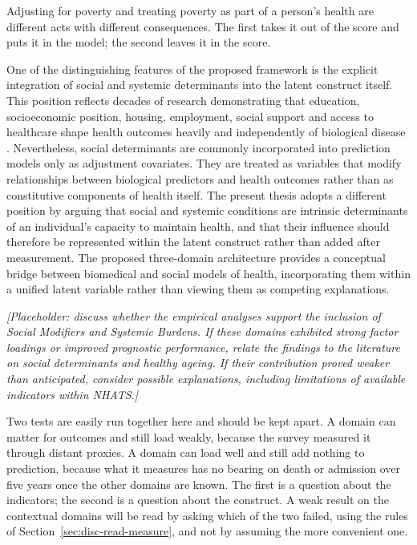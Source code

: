Adjusting for poverty and treating poverty as part of a person's health are
different acts with different consequences. The first takes it out of the score
and puts it in the model; the second leaves it in the score.

One of the distinguishing features of the proposed framework is the explicit integration of social and systemic determinants into the latent construct itself. This position reflects decades of research demonstrating that education, socioeconomic position, housing, employment, social support and access to healthcare shape health outcomes heavily and independently of biological disease \citep{marmot_2005}. Nevertheless, social determinants are commonly incorporated into prediction models only as adjustment covariates. They are treated as variables that modify relationships between biological predictors and health outcomes rather than as constitutive components of health itself. The present thesis adopts a different position by arguing that social and systemic conditions are intrinsic determinants of an individual's capacity to maintain health, and that their influence should therefore be represented within the latent construct rather than added after measurement. The proposed three-domain architecture provides a conceptual bridge between biomedical and social models of health, incorporating them within a unified latent variable rather than viewing them as competing explanations.

\medskip
\noindent\emph{[Placeholder: discuss whether the empirical analyses support the inclusion of Social Modifiers and Systemic Burdens. If these domains exhibited strong factor loadings or improved prognostic performance, relate the findings to the literature on social determinants and healthy ageing. If their contribution proved weaker than anticipated, consider possible explanations, including limitations of available indicators within NHATS.]}

Two tests are easily run together here and should be kept apart. A domain can
matter for outcomes and still load weakly, because the survey measured it through
distant proxies. A domain can load well and still add nothing to prediction, because
what it measures has no bearing on death or admission over five years once the other
domains are known. The first is a question about the indicators; the second is a
question about the construct. A weak result on the contextual domains will be read
by asking which of the two failed, using the rules of
Section~\ref{sec:disc-read-measure}, and not by assuming the more convenient one.

